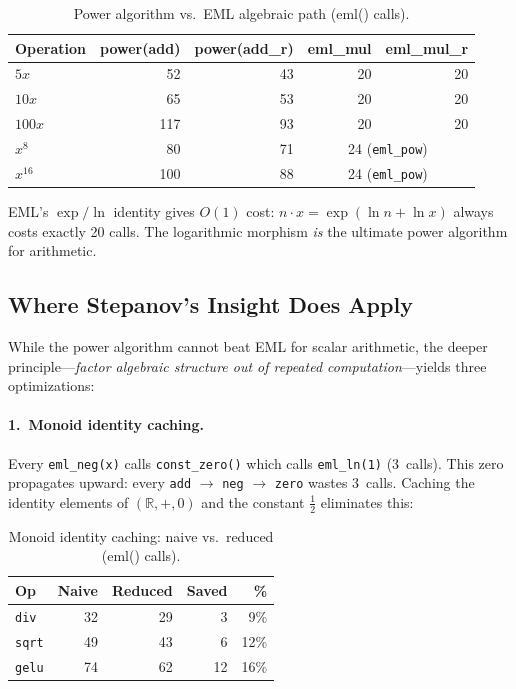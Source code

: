 \documentclass[acmsmall,nonacm]{acmart}
\begin{document}
\begin{table}[h]
\caption{Power algorithm vs.\ EML algebraic path (eml() calls).}
\label{tab:power-vs-eml}
\centering
\begin{tabular}{lrrrr}
\toprule
\textbf{Operation} & \textbf{power(add)} & \textbf{power(add\_r)} & \textbf{eml\_mul} & \textbf{eml\_mul\_r} \\
\midrule
$5x$   & 52  & 43  & 20 & 20 \\
$10x$  & 65  & 53  & 20 & 20 \\
$100x$ & 117 & 93  & 20 & 20 \\
\midrule
$x^{8}$  & 80  & 71  & \multicolumn{2}{c}{24 (\texttt{eml\_pow})} \\
$x^{16}$ & 100 & 88  & \multicolumn{2}{c}{24 (\texttt{eml\_pow})} \\
\bottomrule
\end{tabular}
\end{table}

EML's $\exp/\ln$ identity gives $O(1)$ cost: $n \cdot x = \exp(\ln n +
\ln x)$ always costs exactly 20 calls.  The logarithmic morphism
\emph{is} the ultimate power algorithm for arithmetic.

\subsection{Where Stepanov's Insight Does Apply}

While the power algorithm cannot beat EML for scalar arithmetic, the
deeper principle---\emph{factor algebraic structure out of repeated
computation}---yields three optimizations:

\paragraph{1.\ Monoid identity caching.}
Every \texttt{eml\_neg(x)} calls \texttt{const\_zero()} which calls
\texttt{eml\_ln(1)} (3~calls).  This zero propagates upward: every
\texttt{add} $\to$ \texttt{neg} $\to$ \texttt{zero} wastes 3~calls.
Caching the identity elements of $(\mathbb{R},+,0)$ and the constant
$\tfrac{1}{2}$ eliminates this:

\begin{table}[h]
\caption{Monoid identity caching: naive vs.\ reduced (eml() calls).}
\label{tab:caching}
\centering
\begin{tabular}{lrrrr}
\toprule
\textbf{Op} & \textbf{Naive} & \textbf{Reduced} & \textbf{Saved} & \textbf{\%} \\
\midrule
\texttt{div}  & 32 & 29 & 3  & 9\%  \\
\texttt{sqrt} & 49 & 43 & 6  & 12\% \\
\texttt{gelu} & 74 & 62 & 12 & 16\% \\
\bottomrule
\end{tabular}
\end{table}
\end{document}

